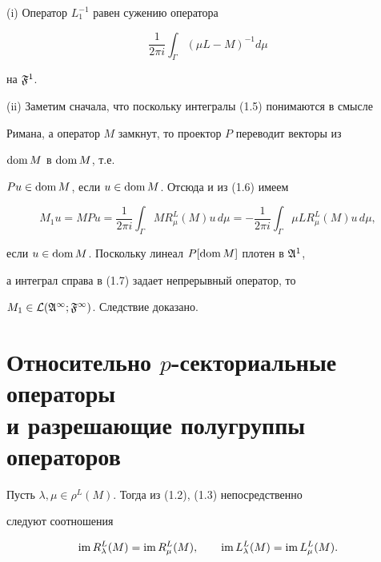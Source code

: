  


\begin{pf} (i) Оператор $L^{-1}_1$ равен сужению оператора 


$$ 


\frac{1}{2\pi i}\int_\Gamma(\mu L-M)^{-1}d\mu 


$$ 


на $\frak F^1$. 


 


(ii) Заметим сначала, что поскольку интегралы (1.5) понимаются в смысле 


Римана, а оператор $M$ замкнут, то проектор $P$ переводит векторы из 


$\operatorname{dom} M$ в $\operatorname{dom} M$, т.е. 


$Pu\in\operatorname{dom} M$, если $u\in\operatorname{dom} M$. Отсюда и из (1.6) имеем 


\begin{equation} 


M_1u=MPu=\frac{1}{2\pi i}\int_\Gamma MR^L_\mu(M)u\,d\mu= 


-\frac{1}{2\pi i}\int_\Gamma\mu LR^L_\mu(M)u\,d\mu, 


\end{equation} 


если $u\in\operatorname{dom} M$. Поскольку линеал $P[\operatorname{dom} M]$ плотен в $\frak A^1$, 


а интеграл справа в (1.7) задает непрерывный оператор, то 


$M_1\in\cal L(\frak A^1;\frak F^1)$. Следствие доказано. 


\end{pf} 


 


\section{Относительно $p$-секториальные операторы\protect\\


и разрешающие полугруппы операторов} 


 


Пусть $\lambda,\mu\in\rho^L(M)$. Тогда из (1.2), (1.3) непосредственно 


следуют соотношения 


\begin{equation} 


\im R^L_\lambda(M)=\im R^L_\mu(M), \qquad 


\im L^L_\lambda(M)=\im L^L_\mu(M). 


\end{equation} 


